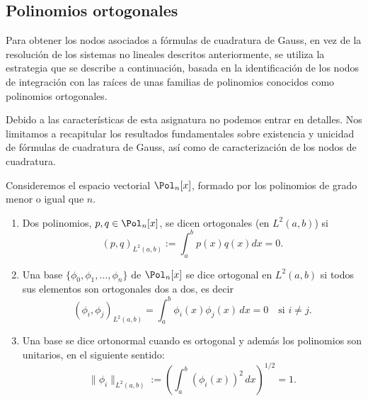 \subsection*{Polinomios ortogonales}
Para obtener los nodos asociados a fórmulas de cuadratura de Gauss, en
vez de la resolución de los sistemas no lineales descritos
anteriormente, se utiliza la estrategia que se describe a
continuación, basada en la identificación de los nodos de integración
con las raíces de unas familias de polinomios conocidos como
polinomios ortogonales.

Debido a las características de esta asignatura no podemos entrar en
detalles. Nos limitamos a recapitular los resultados fundamentales
sobre existencia y unicidad de fórmulas de cuadratura de Gauss, así
como de caracterización de los nodos de cuadratura.




\begin{definition}
  \label{def:pol-orgotonales}
  Consideremos el espacio vectorial $\Pol_n[x]$, formado por los
  polinomios de grado menor o igual que $n$.

  \begin{enumerate}
  \item Dos polinomios, $p,q\in\Pol_n[x]$, se dicen ortogonales (en
    $L^2(a,b)$) si
      \begin{equation*}
      (p,q)_{L^2(a,b)} := \int_a^b p(x)q(x) dx = 0.
    \end{equation*}
  \item Una base $\{\phi_0,\phi_1,\dots,\phi_n\}$ de $\Pol_n[x]$ se
    dice ortogonal en $L^2(a,b)$ si todos sus elementos son ortogonales
    dos a dos, es decir
    \begin{equation*}
      (\phi_i,\phi_j)_{L^2(a,b)} = \int_a^b \phi_i(x) \phi_j(x)\, dx = 0 \quad \text{si } i\neq j.
    \end{equation*}
  \item
    Una base se dice ortonormal cuando es ortogonal y además los
    polinomios son unitarios, en el siguiente sentido:
    \begin{equation*}
      \|\phi_i\|_{L^2(a,b)} := \left(\int_a^b (\phi_i(x))^2 \,dx\right)^{1/2} = 1.
    \end{equation*}
  \end{enumerate}
\end{definition}

